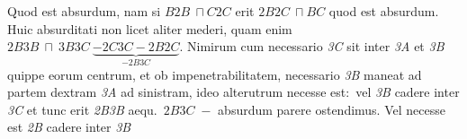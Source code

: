 \rule[0cm]{0mm}{12pt}%
Quod est absurdum, nam si $B{\scriptstyle \textit{2}}B\ \sqcap C{\scriptstyle \textit{2}}C$ erit ${\scriptstyle \textit{2}}B{\scriptstyle \textit{2}}C\ \sqcap BC$ quod est absurdum. 
%
\pend 
\pstart
Huic absurditati non licet aliter mederi, quam   
%
%
enim
%
${\scriptstyle \textit{2}}B{\scriptstyle \textit{3}}B \ \sqcap \ {\scriptstyle \textit{3}}B{\scriptstyle \textit{3}}C \ \underbrace{
- {\scriptstyle \textit{2}}C{\scriptstyle \textit{3}}C - {\scriptstyle \textit{2}}B{\scriptstyle \textit{2}}C
}_{\displaystyle -{\scriptstyle \textit{2}}B{\scriptstyle \textit{3}}C}$.
%
\pend \vspace{1mm}\pstart
Nimirum cum necessario \textit{{\scriptsize3}C} sit inter \textit{{\scriptsize3}A} et \textit{{\scriptsize3}B} quippe eorum centrum,%
\protect{} et ob impenetrabilitatem,%
\protect{} necessario \textit{{\scriptsize3}B} maneat ad partem dextram \textit{{\scriptsize3}A} ad sinistram, ideo alterutrum necesse est\lbrack:\rbrack\ 
vel \textit{{\scriptsize3}B} cadere inter \textit{{\scriptsize3}C}
%
%
et tunc erit 
\textit{{\scriptsize2}B{\scriptsize3}B} 
aequ.\ 
${\scriptstyle \textit{2}}B{\scriptstyle \textit{3}}C\; - $  
%
%
absurdum parere ostendimus. Vel necesse est 
\textit{{\scriptsize2}B} 
cadere inter 
\textit{{\scriptsize3}B} 
